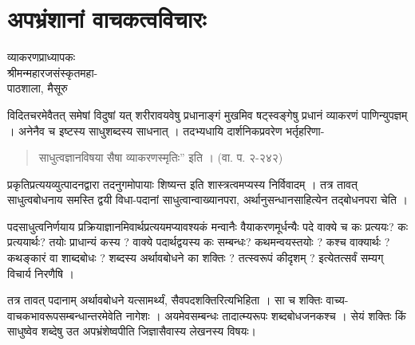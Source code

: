 {\fontsize{15}{17}\selectfont
\chapter{अपभ्रंशानां वाचकत्वविचारः}

\begin{center}
\smallskip

व्याकरणप्राध्यापकः\\
श्रीमन्महारजसंस्कृतमहा-\\
पाठशाला, मैसूरु
\addrule
\end{center}

विदितचरमेवैतत् समेषां विदुषां यत् शरीरावयवेषु प्रधानाङ्गं मुखमिव षट्स्वङ्गेषु प्रधानं व्याकरणं पाणिन्युपज्ञम् । अनेनैव च इष्टस्य साधुशब्दस्य साधनात् । तदभ्यधायि दार्शनिकप्रवरेण भर्तृहरिणा-
\begin{verse}
साधुत्वज्ञानविषया सैषा व्याकरणस्मृतिः” इति । (वा. प. २-२४२)
\end{verse}
प्रकृतिप्रत्ययव्युत्पादनद्वारा तदनुगमोपायाः शिष्यन्त इति शास्त्रत्वमप्यस्य निर्विवादम् । तत्र तावत् साधुत्वबोधनाय समस्ति द्वयी विधा-पदानां साधुत्वान्वाख्यानपरा, अर्थानुसन्धानसाहित्येन तद्बोधनपरा चेति । 

पदसाधुत्वनिर्णयाय प्रक्रियाज्ञानमिवार्थप्रत्ययमप्यावश्यकं मन्वानैः वैयाकरणमूर्धन्यैः पदे वाक्ये च कः प्रत्ययः? कः प्रत्ययार्थः? तयोः प्राधान्यं कस्य ? वाक्ये पदार्थद्वयस्य कः सम्बन्धः? कथमन्वयस्तयोः ? कश्च वाक्यार्थः ? कथङ्कारं वा शाब्दबोधः ? शब्दस्य अर्थावबोधने का शक्तिः ? तत्स्वरूपं कीदृशम् ? इत्येतत्सर्वं सम्यग् विचार्य निरणैषि ।  

तत्र तावत् पदानाम् अर्थावबोधने यत्सामर्थ्यं, सैवपदशक्तिरित्यभिहिता । सा च शक्तिः वाच्य-वाचकभावरूपसम्बन्धान्तरमेवेति नागेशः । अयमेवसम्बन्धः तादात्म्यरूपः शब्दबोधजनकश्च । सेयं शक्तिः किं साधुष्वेव शब्देषु उत अपभ्रंशेष्वपीति जिज्ञासैवास्य लेखनस्य विषयः।

}
